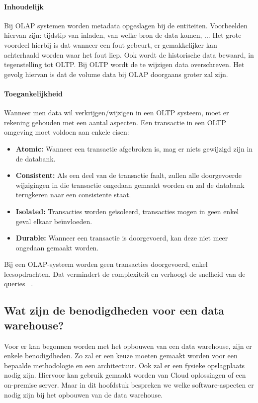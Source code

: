 \paragraph{Inhoudelijk}
Bij OLAP systemen worden metadata opgeslagen bij de entiteiten. Voorbeelden hiervan zijn: tijdstip van inladen, van welke bron de data komen, ... Het grote voordeel hierbij is dat wanneer een fout gebeurt, er gemakkelijker kan achterhaald worden waar het fout liep. Ook wordt de historische data bewaard, in tegenstelling tot OLTP. Bij OLTP wordt de te wijzigen data overschreven. Het gevolg hiervan is dat de volume data bij OLAP doorgaans groter zal zijn.

\paragraph{Toegankelijkheid}
Wanneer men data wil verkrijgen/wijzigen in een OLTP systeem, moet er rekening gehouden met een aantal aspecten. Een transactie in een OLTP omgeving moet voldoen aan enkele eisen:
\begin{itemize}
	\item \textbf{Atomic:} Wanneer een transactie afgebroken is, mag er niets gewijzigd zijn in de databank.
	\item \textbf{Consistent:} Als een deel van de transactie faalt, zullen alle doorgevoerde wijzigingen in die transactie ongedaan gemaakt worden en zal de databank terugkeren naar een consistente staat.
	\item \textbf{Isolated:} Transacties worden geïsoleerd, transacties mogen in geen enkel geval elkaar beïnvloeden.
	\item \textbf{Durable:} Wanneer een transactie is doorgevoerd, kan deze niet meer ongedaan gemaakt worden.
\end{itemize}  

Bij een OLAP-systeem worden geen transacties doorgevoerd, enkel leesopdrachten. Dat vermindert de complexiteit en verhoogt de snelheid van de queries ~\autocite{Satyanarayana2010}. 

\subsection{Wat zijn de benodigdheden voor een data warehouse?}
Voor er kan begonnen worden met het opbouwen van een data warehouse, zijn er enkele benodigdheden. Zo zal er een keuze moeten gemaakt worden voor een bepaalde methodologie en een architectuur. Ook zal er een fysieke opslagplaats nodig zijn. Hiervoor kan gebruik gemaakt worden van Cloud oplossingen of een on-premise server. Maar in dit hoofdstuk bespreken we welke software-aspecten er nodig zijn bij het opbouwen van de data warehouse.

